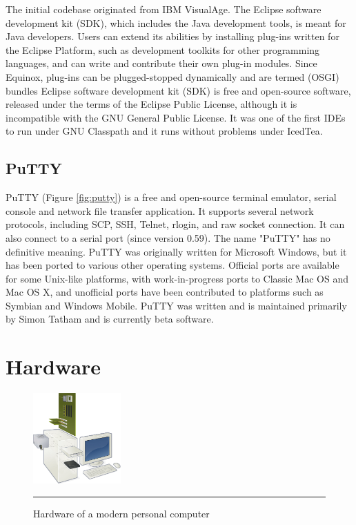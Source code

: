 The initial codebase originated from IBM VisualAge. The Eclipse software development kit (SDK), which includes the Java development tools, is meant for Java developers. Users can extend its abilities by installing plug-ins written for the Eclipse Platform, such as development toolkits for other programming languages, and can write and contribute their own plug-in modules. Since Equinox, plug-ins can be plugged-stopped dynamically and are termed (OSGI) bundles Eclipse software development kit (SDK) is free and open-source software, released under the terms of the Eclipse Public License, although it is incompatible with the GNU General Public License. It was one of the first IDEs to run under GNU Classpath and it runs without problems under IcedTea.

\subsection{PuTTY}
PuTTY (Figure \ref{fig:putty}) is a free and open-source terminal emulator, serial console and network file transfer application. It supports several network protocols, including SCP, SSH, Telnet, rlogin, and raw socket connection. It can also connect to a serial port (since version 0.59). The name "PuTTY" has no definitive meaning.
PuTTY was originally written for Microsoft Windows, but it has been ported to various other operating systems. Official ports are available for some Unix-like platforms, with work-in-progress ports to Classic Mac OS and Mac OS X, and unofficial ports have been contributed to platforms such as Symbian and Windows Mobile.
PuTTY was written and is maintained primarily by Simon Tatham and is currently beta software.
\clearpage

\section{Hardware}

\begin{figure}
	\begin{center}
		\includegraphics[width=0.3\textwidth]{./images/hardware.jpg}
	\end{center}
	\rule{0.3\textwidth}{0.5pt}
	\caption{Hardware of a modern personal computer}
	\label{fig:hardware}
\end{figure}


